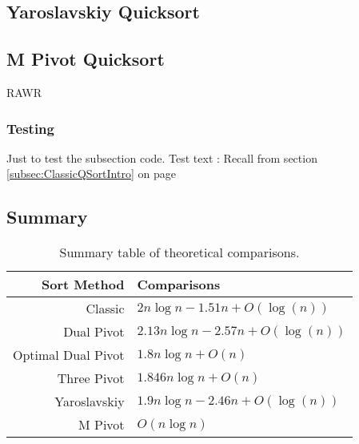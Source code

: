 	\subsection{Yaroslavskiy Quicksort}	
		\label{subsec:YaroslavskiyQSortIntro}
	
	\subsection{M Pivot Quicksort}	
		\label{subsec:MPivotQSortIntro}
	
		RAWR
		\subsubsection{Testing}
			Just to test the subsection code.
			Test text : Recall from section \ref{subsec:ClassicQSortIntro} on page \pageref{subsec:ClassicQSortIntro}

	\subsection{Summary}
		\begin{table}
			\begin{center}
				\begin{tabular}{|r|l|}
					\hline
					Sort Method        &   Comparisons                          \\ \hline \hline
					Classic            &   $2n \log n - 1.51n  + O(\log(n))$   \\ \hline
					Dual Pivot         &   $2.13n \log n - 2.57n + O(\log(n))$ \\ \hline
					Optimal Dual Pivot &   $1.8n \log n + O(n)$               \\ \hline
					Three Pivot        &   $1.846n \log n + O(n)$             \\ \hline
					Yaroslavskiy       &   $1.9n \log n - 2.46n + O(\log(n))$  \\ \hline
					M Pivot            &   $O(n \log n)$                        \\ 
					\hline
				\end{tabular}
				\caption{Summary table of theoretical comparisons.}
				\label{tab:CompSummary}
			\end{center}
		\end{table}

